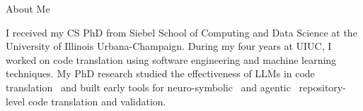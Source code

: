 \begin{rubric}{About Me}
\begin{minipage}{\linewidth}
{\large I received my CS PhD from Siebel School of Computing and Data Science at the University of Illinois Urbana-Champaign. During my four years at UIUC, I worked on code translation using software engineering and machine learning techniques. My PhD research studied the effectiveness of LLMs in code translation~\cite{pan2024lost} and built early tools for neuro-symbolic~\cite{ibrahimzada2025alphatrans,ke2027mockingbird} and agentic~\cite{ibrahimzada2026recodeagent,ibrahimzada2026matchfixagent} repository-level code translation and validation.}
\end{minipage}
\end{rubric}
